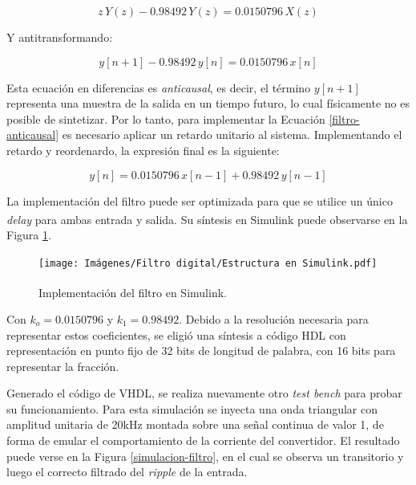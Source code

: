 \begin{equation*}
    z \, Y(z) - 0.98492 \, Y(z) = 0.0150796 \, X(z)
\end{equation*}

Y antitransformando:

\begin{equation}
    y[n+1] - 0.98492 \, y[n] = 0.0150796 \, x[n]
    \label{filtro-anticausal}
\end{equation}

Esta ecuación en diferencias es \emph{anticausal}, es decir, el término $y[n+1]$ representa una muestra de la salida en un tiempo futuro, lo cual físicamente no es posible de sintetizar. Por lo tanto, para implementar la Ecuación \ref{filtro-anticausal} es necesario aplicar un retardo unitario al sistema. Implementando el retardo y reordenardo, la expresión final es la siguiente:

\begin{equation}
    \boxed{y[n] = 0.0150796 \, x[n-1] + 0.98492 \, y[n-1]}
\end{equation}

La implementación del filtro puede ser optimizada para que se utilice un único \emph{delay} para ambas entrada y salida. Su síntesis en Simulink\textsuperscript\textregistered \hspace{0.6pt} puede observarse en la Figura \ref{estructura-filtro}.

\begin{figure}[hbt!]
    \centering
    \texttt{[image: Imágenes/Filtro digital/Estructura en Simulink.pdf]}    
    \caption{Implementación del filtro en Simulink\textsuperscript\textregistered.}
    \label{estructura-filtro}
\end{figure}

Con $k_o = 0.0150796$ y $k_1 = 0.98492$. Debido a la resolución necesaria para representar estos coeficientes, se eligió una síntesis a código HDL con representación en punto fijo de 32 bits de longitud de palabra, con 16 bits para representar la fracción.

Generado el código de VHDL, se realiza nuevamente otro \emph{test bench} para probar su funcionamiento. Para esta simulación se inyecta una onda triangular con amplitud unitaria de 20kHz montada sobre una señal continua de valor 1, de forma de emular el comportamiento de la corriente del convertidor. El resultado puede verse en la Figura \ref{simulacion-filtro}, en el cual se observa un transitorio y luego el correcto filtrado del \emph{ripple} de la entrada.

